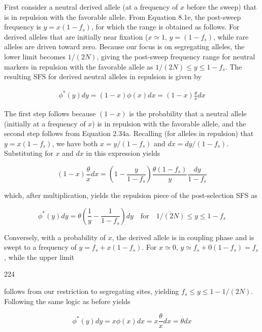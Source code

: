 \documentclass{article}
\begin{document}
First consider a neutral derived allele (at a frequency of $x$ before the sweep) that is in repulsion with the favorable allele. From Equation 8.1e, the post-sweep frequency is $y = x(1 - f_s)$, for which the range is obtained as follows. For derived alleles that are initially near fixation ($x \simeq 1$, $y = (1 - f_s)$, while rare alleles are driven toward zero. Because our focus is on segregating alleles, the lower limit becomes $1/(2N)$, giving the post-sweep frequency range for neutral markers in repulsion with the favorable allele as $1/(2N) \leq y \leq 1 - f_s$. The resulting SFS for derived neutral alleles in repulsion is given by

\begin{equation}
\begin{align*}\phi^*(y)dy=(1-x)\phi(x)dx=(1-x)\frac{\theta}{x}dx\end{align*}
\end{equation}

The first step follows because  $ (1 - x) $ is the probability that a neutral allele (initially at a frequency of  $ x $) is in repulsion with the favorable allele, and the second step follows from Equation 2.34a. Recalling (for alleles in repulsion) that  $ y = x(1 - f_s) $, we have both  $ x = y/(1 - f_s) $ and  $ dx = dy/(1 - f_s) $. Substituting for  $ x $ and  $ dx $ in this expression yields

\begin{equation}
(1-x)\frac{\theta}{x}dx=\left(1-\frac{y}{1-f_{s}}\right)\frac{\theta(1-f_{s})}{y}\frac{dy}{1-f_{s}}
\end{equation}

which, after multiplication, yields the repulsion piece of the post-selection SFS as

\begin{equation}
\phi^{*}(y)d y=\theta\left(\frac{1}{y}-\frac{1}{1-f_{s}}\right)d y\quad\mathrm{f o r}\quad1/(2N)\leq y\leq1-f_{s}
\end{equation}

Conversely, with a probability of $x$, the derived allele is in coupling phase and is swept to a frequency of $y = f_{s} + x(1 - f_{s})$. For $x \simeq 0$, $y \simeq f_{s} + 0(1 - f_{s}) = f_{s}$, while the upper limit

224

follows from our restriction to segregating sites, yielding  $ f_s \leq y \leq 1 - 1/(2N) $. Following the same logic as before yields

\begin{equation}
\phi^{*}(y)d y=x\phi(x)d x=x\frac{\theta}{x}d x=\theta d x
\end{equation}
\end{document}
